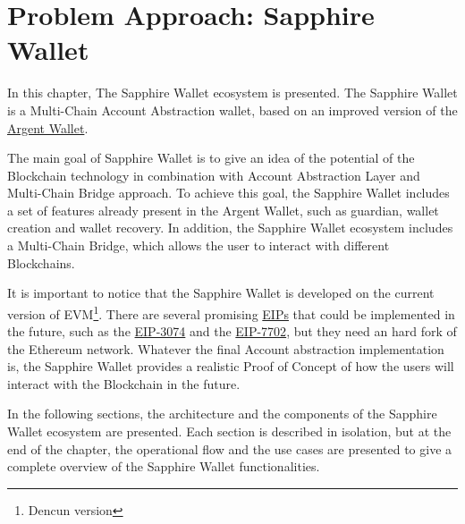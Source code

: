 \chapter{Problem Approach: Sapphire Wallet}
\label{chap:problem_approach}

In this chapter, The Sapphire Wallet ecosystem is presented. The Sapphire Wallet is a Multi-Chain Account Abstraction wallet, based on an improved version of the \hyperref[subsec:argent]{Argent Wallet}.

The main goal of Sapphire Wallet is to give an idea of the potential of the Blockchain technology in combination with Account Abstraction Layer and Multi-Chain Bridge approach. To achieve this goal, the Sapphire Wallet includes a set of features already present in the Argent Wallet, such as guardian, wallet creation and wallet recovery. In addition, the Sapphire Wallet ecosystem includes a Multi-Chain Bridge, which allows the user to interact with different Blockchains. 

It is important to notice that the Sapphire Wallet is developed on the current version of EVM\footnote{Dencun version}. There are several promising \hyperref[subsec:eips]{EIPs} that could be implemented in the future, such as the \hyperref[subsubsec:eip-3074]{EIP-3074} and the \hyperref[subsubsec:erc-7702]{EIP-7702}, but they need an hard fork of the Ethereum network. Whatever the final Account abstraction implementation is, the Sapphire Wallet provides a realistic Proof of Concept of how the users will interact with the Blockchain in the future.

In the following sections, the architecture and the components of the Sapphire Wallet ecosystem are presented. Each section is described in isolation, but at the end of the chapter, the operational flow and the use cases are presented to give a complete overview of the Sapphire Wallet functionalities.







